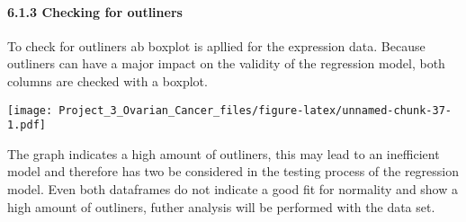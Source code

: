 \documentclass[]{article}
\newenvironment{Shaded}{\begin{snugshade}}{\end{snugshade}}
\newcommand{\CommentTok}[1]{\textcolor[rgb]{0.56,0.35,0.01}{\textit{#1}}}
\newcommand{\DataTypeTok}[1]{\textcolor[rgb]{0.13,0.29,0.53}{#1}}
\newcommand{\DecValTok}[1]{\textcolor[rgb]{0.00,0.00,0.81}{#1}}
\newcommand{\KeywordTok}[1]{\textcolor[rgb]{0.13,0.29,0.53}{\textbf{#1}}}
\newcommand{\NormalTok}[1]{#1}
\newcommand{\OperatorTok}[1]{\textcolor[rgb]{0.81,0.36,0.00}{\textbf{#1}}}
\newcommand{\StringTok}[1]{\textcolor[rgb]{0.31,0.60,0.02}{#1}}
\let\oldparagraph\paragraph
\renewcommand{\paragraph}[1]{\oldparagraph{#1}\mbox{}}
\begin{document}
\hypertarget{checking-for-outliners}{%
\paragraph{6.1.3 Checking for outliners}\label{checking-for-outliners}}

To check for outliners ab boxplot is apllied for the expression data.
Because outliners can have a major impact on the validity of the
regression model, both columns are checked with a boxplot.

\begin{Shaded}
\end{Shaded}

\texttt{[image: Project\_3\_Ovarian\_Cancer\_files/figure-latex/unnamed-chunk-37-1.pdf]}

The graph indicates a high amount of outliners, this may lead to an
inefficient model and therefore has two be considered in the testing
process of the regression model. Even both dataframes do not indicate a
good fit for normality and show a high amount of outliners, futher
analysis will be performed with the data set.
\end{document}
